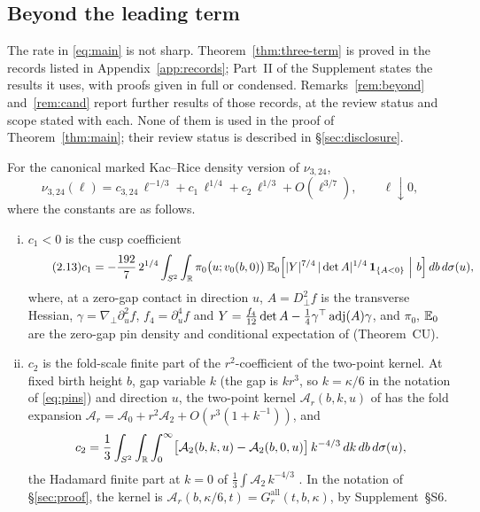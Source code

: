 \subsection{Beyond the leading term}

The rate in \eqref{eq:main} is not sharp. Theorem~\ref{thm:three-term} is proved in the records listed in Appendix~\ref{app:records}; Part~II of the Supplement states the results it uses, with proofs given in full or condensed. Remarks~\ref{rem:beyond} and~\ref{rem:cand} report further results of those records, at the review status and scope stated with each. None of them is used in the proof of Theorem~\ref{thm:main}; their review status is described in \S\ref{sec:disclosure}.

\begin{theorem}\label{thm:three-term}
For the canonical marked Kac--Rice density version of $\nu_{3,24}$,
\begin{equation}\tag{2.12}\label{eq:three-term}
\nu_{3,24}(\ell)=c_{3,24}\,\ell^{-1/3}+c_1\,\ell^{1/4}+c_2\,\ell^{1/3}+O(\ell^{3/7}),\qquad \ell\downarrow0,
\end{equation}
where the constants are as follows.
\begin{enumerate}[(i)]
\item $c_1<0$ is the cusp coefficient
\begin{equation}\tag{2.13}\label{eq:c1}
c_1=-\frac{192}{7}\,2^{1/4}\int_{S^2}\int_{\R}\pi_0\bigl(u;v_0(b,0)\bigr)\,
\E_0\Bigl[|Y|^{7/4}\,|\det A|^{1/4}\,\ind_{\{A<0\}}\ \Big|\ b\Bigr]\,db\,d\sigma(u),
\end{equation}
where, at a zero-gap contact in direction $u$, $A=D_\perp^2f$ is the transverse Hessian, $\gamma=\nabla_\perp\partial_u^2f$, $f_4=\partial_u^4f$ and $Y=\tfrac{f_4}{12}\det A-\tfrac14\gamma^{\top}\operatorname{adj}(A)\gamma$, and $\pi_0$, $\mathbb E_0$ are the zero-gap pin density and conditional expectation of  (Theorem~CU).
\item $c_2$ is the fold-scale finite part of the $r^2$-coefficient of the two-point kernel. At fixed birth height $b$, gap variable $k$ (the gap is $kr^3$, so $k=\kappa/6$ in the notation of \eqref{eq:pins}) and direction $u$, the two-point kernel $\mathcal A_r(b,k,u)$ of  has the fold expansion $\mathcal A_r=\mathcal A_0+r^2\mathcal A_2+O(r^3(1+k^{-1}))$, and
\[
c_2=\frac13\int_{S^2}\int_{\mathbb R}\int_0^\infty\bigl[\mathcal A_2(b,k,u)-\mathcal A_2(b,0,u)\bigr]\,k^{-4/3}\,dk\,db\,d\sigma(u),
\]
the Hadamard finite part at $k=0$ of $\tfrac13\int\mathcal A_2\,k^{-4/3}$ . In the notation of \S\ref{sec:proof}, the kernel is $\mathcal A_r(b,\kappa/6,t)=G^{\mathrm{all}}_r(t,b,\kappa)$, by Supplement~\S S6.

\end{enumerate}
\end{theorem}
